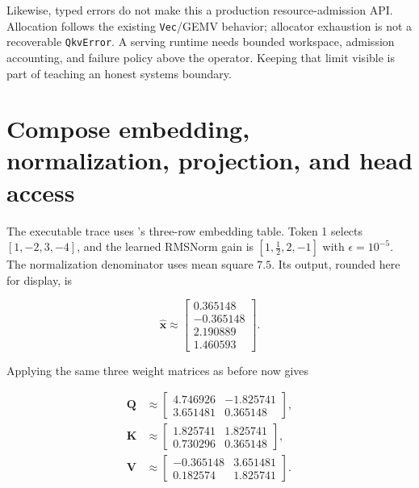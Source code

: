 Likewise, typed errors do not make this a production resource-admission
API. Allocation follows the existing \texttt{Vec}/GEMV behavior;
allocator exhaustion is not a recoverable \texttt{QkvError}. A serving
runtime needs bounded workspace, admission accounting, and failure
policy above the operator. Keeping that limit visible is part of
teaching an honest systems boundary.

\section{Compose embedding, normalization, projection, and head
access}\label{compose-embedding-normalization-projection-and-head-access}

The executable trace uses 's three-row embedding table. Token 1
selects \([1,-2,3,-4]\), and the learned RMSNorm gain is
\([1,\tfrac12,2,-1]\) with \(\epsilon=10^{-5}\). The normalization
denominator uses mean square \(7.5\). Its output, rounded here for
display, is

\begin{equation}
\widehat{\mathbf{x}}\approx
\begin{bmatrix}
0.365148\\-0.365148\\2.190889\\1.460593
\end{bmatrix}.
\end{equation}

Applying the same three weight matrices as before now gives

\begin{equation}
\begin{aligned}
\mathbf{Q}&\approx
\begin{bmatrix}4.746926&-1.825741\\3.651481&0.365148\end{bmatrix},\\
\mathbf{K}&\approx
\begin{bmatrix}1.825741&1.825741\\0.730296&0.365148\end{bmatrix},\\
\mathbf{V}&\approx
\begin{bmatrix}-0.365148&3.651481\\0.182574&1.825741\end{bmatrix}.
\end{aligned}
\end{equation}

